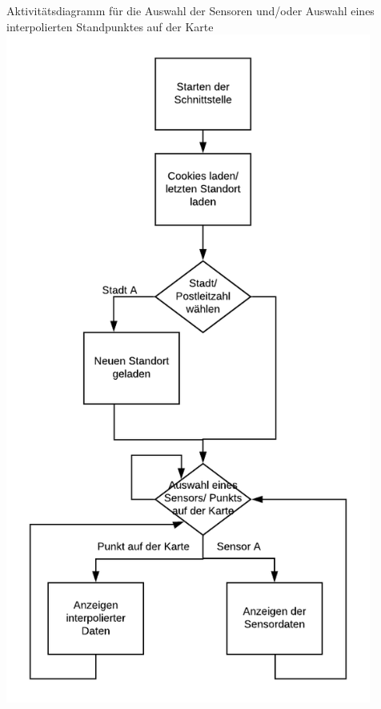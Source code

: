Aktivitätsdiagramm für die Auswahl der Sensoren und/oder Auswahl eines interpolierten Standpunktes auf der Karte
\includegraphics[width=0.9\textwidth]{media/AuswahlSensoren} 

